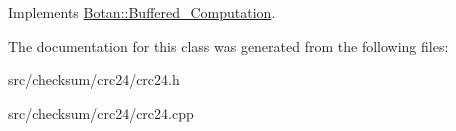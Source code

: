 Implements \hyperlink{classBotan_1_1Buffered__Computation_a7b2e6776ea9ded2e3f9da5a760b7d34b}{Botan\-::\-Buffered\-\_\-\-Computation}.



The documentation for this class was generated from the following files\-:\begin{DoxyCompactItemize}
\item 
src/checksum/crc24/crc24.\-h\item 
src/checksum/crc24/crc24.\-cpp\end{DoxyCompactItemize}
